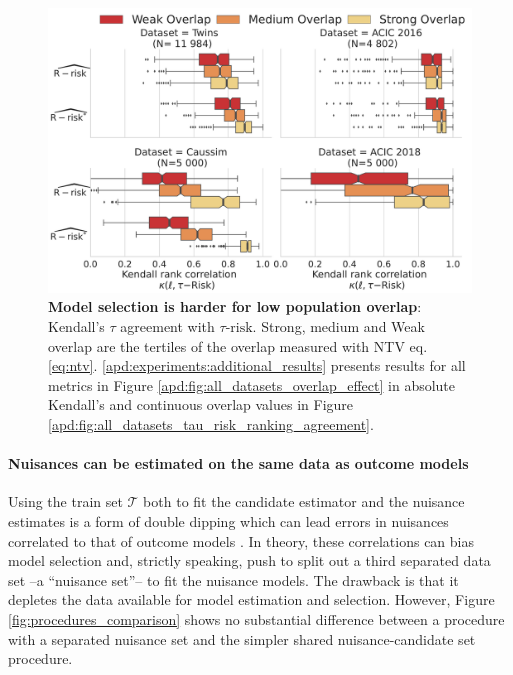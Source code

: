 \documentclass[french,12pt,twoside,a4paper]{book}
\begin{document}
\begin{figure}[h!]
  \begin{minipage}{.35\linewidth}
    \caption{\textbf{Model selection is harder for low population
        overlap}:
      Kendall's $\tau$ agreement with $\tau\text{-risk}$. Strong, medium and Weak overlap
      are the tertiles of the overlap measured with NTV eq. \ref{eq:ntv}. \ref{apd:experiments:additional_results} presents results for all
      metrics in Figure \ref{apd:fig:all_datasets_overlap_effect} in absolute
      Kendall's and continuous overlap values in Figure
        {\ref{apd:fig:all_datasets_tau_risk_ranking_agreement}}.}\label{fig:all_datasets_overlap_effect_r_risk}
  \end{minipage}
  \hfill
  \begin{minipage}{0.6\linewidth}
    \centering
    \includegraphics[width=\linewidth]{img/chapter_5/_2_overlap_influence_overlap_by_bin_comparaison_kendall_by_Dataset_r_risk_only.pdf}
  \end{minipage}
\end{figure}

\paragraph{Nuisances can be estimated on the same data as outcome models}

Using the train set $\mathcal{T}$ both to fit the candidate estimator and the
nuisance estimates is a form of double dipping which can lead errors in
nuisances correlated to that of outcome models
\citep{nie_quasioracle_2017}. In theory, these correlations can bias model
selection and, strictly speaking, push
to split out a third separated data set --a ``nuisance set''-- to fit the
nuisance models. The drawback is that it depletes the data available for
model estimation and selection. However, Figure
\ref{fig:procedures_comparison} shows no substantial difference between a procedure with a separated
nuisance set and the simpler shared nuisance-candidate set procedure.
\end{document}
